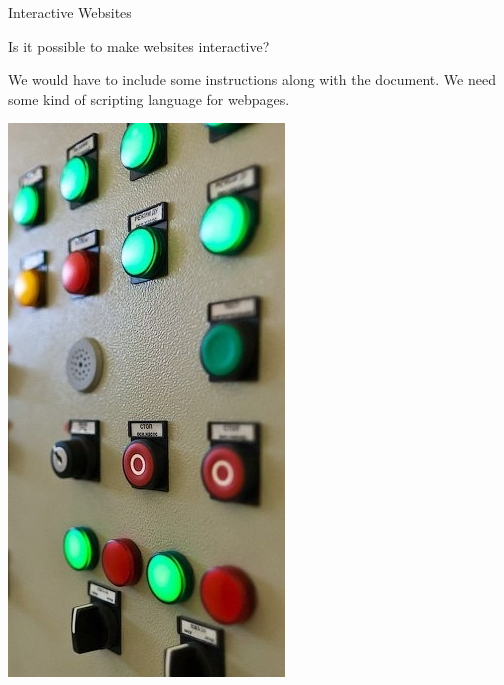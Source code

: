\documentclass{lug}
\newcommand{\pmidg}[1]{\parbox{\widthof{#1}}{#1}}
\newcommand{\splitslide}[4]{%
    \noindent
    \begin{minipage}{#1 \textwidth - #2 }
        #3
    \end{minipage}%
    \hspace{ \dimexpr #2 * 2 \relax }%
    \begin{minipage}{\textwidth - #1 \textwidth - #2 }
        #4
    \end{minipage}
}
\begin{document}
\begin{frame}{Interactive Websites}
    \splitslide{0.7}{1em}{

        Is it possible to make websites interactive?

        \vspace{2ex}

        We would have to include some instructions along with the document. We
        need some kind of scripting language for webpages.

    }{\pmidg{
        \includegraphics[width=\columnwidth]{graphics/buttons}
    }}
\end{frame}
\end{document}
